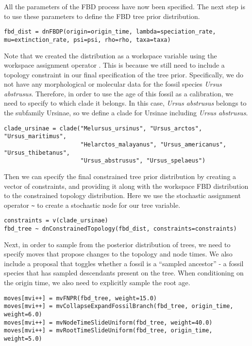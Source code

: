 All the parameters of the FBD process have now been specified. 
The next step is to use these parameters to define the FBD tree prior distribution.

{\tt \begin{snugshade*}
\begin{lstlisting}
fbd_dist = dnFBDP(origin=origin_time, lambda=speciation_rate, mu=extinction_rate, psi=psi, rho=rho, taxa=taxa)
\end{lstlisting}
\end{snugshade*}}

Note that we created the distribution as a workspace variable using the workspace assignment operator \cl{=}.
This is because we still need to include a topology constraint in our final specification of the tree prior.
Specifically, we do not have any morphological or molecular data for the fossil species \textit{Ursus abstrusus}.
Therefore, in order to use the age of this fossil as a calibration, we need to specify to which clade it belongs.
In this case, \textit{Ursus abstrusus} belongs to the subfamily Ursinae, so we define a clade for Ursinae including \textit{Ursus abstrusus}.

{\tt \begin{snugshade*}
\begin{lstlisting}
clade_ursinae = clade("Melursus_ursinus", "Ursus_arctos", "Ursus_maritimus", 
                      "Helarctos_malayanus", "Ursus_americanus", "Ursus_thibetanus", 
                      "Ursus_abstrusus", "Ursus_spelaeus")
\end{lstlisting}
\end{snugshade*}}

Then we can specify the final constrained tree prior distribution by creating a vector of constraints, and providing it along with the workspace FBD distribution to the constrained topology distribution.
Here we use the stochastic assignment operator \verb+~+ to create a stochastic node for our tree variable. 

{\tt \begin{snugshade*}
\begin{lstlisting}
constraints = v(clade_ursinae)
fbd_tree ~ dnConstrainedTopology(fbd_dist, constraints=constraints)
\end{lstlisting}
\end{snugshade*}}

Next, in order to sample from the posterior distribution of trees, we need to specify moves that propose changes to the  topology and node times.
We also include a proposal that toggles whether a fossil is a ``sampled ancestor'' - a fossil species that has sampled descendants present on the tree.
When conditioning on the origin time, we also need to explicitly sample the root age.
{\tt \begin{snugshade*}
\begin{lstlisting}
moves[mvi++] = mvFNPR(fbd_tree, weight=15.0)
moves[mvi++] = mvCollapseExpandFossilBranch(fbd_tree, origin_time, weight=6.0)
moves[mvi++] = mvNodeTimeSlideUniform(fbd_tree, weight=40.0)
moves[mvi++] = mvRootTimeSlideUniform(fbd_tree, origin_time, weight=5.0)
\end{lstlisting}
\end{snugshade*}}


